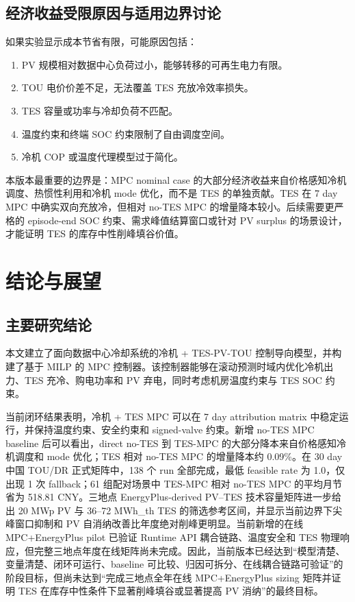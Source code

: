 \documentclass[UTF8,a4paper,12pt]{ctexrep}
\begin{document}
\section{经济收益受限原因与适用边界讨论}

如果实验显示成本节省有限，可能原因包括：

\begin{enumerate}[label=(\arabic*)]
  \item PV 规模相对数据中心负荷过小，能够转移的可再生电力有限。
  \item TOU 电价价差不足，无法覆盖 TES 充放冷效率损失。
  \item TES 容量或功率与冷却负荷不匹配。
  \item 温度约束和终端 SOC 约束限制了自由调度空间。
  \item 冷机 COP 或温度代理模型过于简化。
\end{enumerate}

本版本最重要的边界是：MPC nominal case 的大部分经济收益来自价格感知冷机调度、热惯性利用和冷机 mode 优化，而不是 TES 的单独贡献。TES 在 7 day MPC 中确实双向充放冷，但相对 no-TES MPC 的增量降本较小。后续需要更严格的 episode-end SOC 约束、需求峰值结算窗口或针对 PV surplus 的场景设计，才能证明 TES 的库存中性削峰填谷价值。

\chapter{结论与展望}

\section{主要研究结论}

本文建立了面向数据中心冷却系统的冷机 + TES-PV-TOU 控制导向模型，并构建了基于 MILP 的 MPC 控制器。该控制器能够在滚动预测时域内优化冷机出力、TES 充冷、购电功率和 PV 弃电，同时考虑机房温度约束与 TES SOC 约束。

当前闭环结果表明，冷机 + TES MPC 可以在 7 day attribution matrix 中稳定运行，并保持温度约束、安全约束和 signed-valve 约束。新增 no-TES MPC baseline 后可以看出，direct no-TES 到 TES-MPC 的大部分降本来自价格感知冷机调度和 mode 优化；TES 相对 no-TES MPC 的增量降本约 0.09\%。在 30 day 中国 TOU/DR 正式矩阵中，138 个 run 全部完成，最低 feasible rate 为 1.0，仅出现 1 次 fallback；61 组配对场景中 TES-MPC 相对 no-TES MPC 的平均月节省为 518.81 CNY。三地点 EnergyPlus-derived PV--TES 技术容量矩阵进一步给出 20 MWp PV 与 36--72 MWh\_th TES 的筛选参考区间，并显示当前边界下尖峰窗口抑制和 PV 自消纳改善比年度绝对削峰更明显。当前新增的在线 MPC+EnergyPlus pilot 已验证 Runtime API 耦合链路、温度安全和 TES 物理响应，但完整三地点年度在线矩阵尚未完成。因此，当前版本已经达到“模型清楚、变量清楚、闭环可运行、baseline 可比较、归因可拆分、在线耦合链路可验证”的阶段目标，但尚未达到“完成三地点全年在线 MPC+EnergyPlus sizing 矩阵并证明 TES 在库存中性条件下显著削峰填谷或显著提高 PV 消纳”的最终目标。
\end{document}
